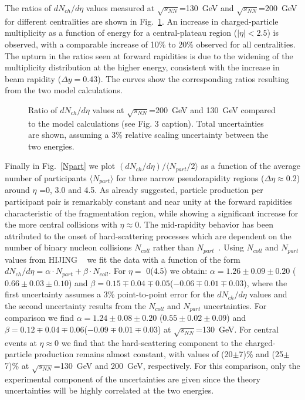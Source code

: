 \documentclass[preprint,showpacs,preprintnumbers,amsmath,amssymb]{revtex4}
\begin{document}
The ratios of  $dN_{ch}/d\eta$ 
values  measured at
$\sqrt{s_{NN}}$=130~GeV and $\sqrt{s_{NN}}$=200~GeV for different
centralities are shown in Fig.~\ref{dndeta_ratios}. An
increase in charged-particle multiplicity as a function of
energy for a central-plateau region ($|\eta| < 2.5$) is observed, 
with  a comparable increase  of 10\% to
20\% observed for all centralities. 
The upturn in the ratios seen at forward rapidities is due to the 
widening of the multiplicity distribution at the higher energy, 
consistent with the increase in beam rapidity ($\Delta y = 0.43$). 
The curves show the corresponding ratios resulting from the 
two model calculations.
\begin{figure}
  \caption{
    Ratio of $dN_{ch}/d\eta$ values 
    at $\sqrt{s_{NN}}$=200~GeV and 130~GeV
    compared to the model calculations (see Fig. 3 caption). 
    Total uncertainties are shown, assuming a 3\% relative scaling
    uncertainty between the two energies.}
  \label{dndeta_ratios}
\end{figure}

Finally in Fig.~\ref{Npart} we plot 
$(dN_{ch}/d\eta)/\langle N_{part}/2\rangle$
as a function of
the average number of participants $\langle N_{part}\rangle$ 
for three narrow pseudorapidity
regions ($\Delta \eta \approx 0.2$) around $\eta$ =0, 3.0 and
4.5. As already 
suggested, particle production per participant
pair is remarkably constant and near unity
at the  forward rapidities characteristic
of the fragmentation region, while showing a significant increase 
for the more central collisions with $\eta\approx 0$. 
The mid-rapidity behavior has been attributed to the
onset of hard-scattering processes which are dependent on the number of 
binary nucleon collisions
$N_{coll}$ rather than $N_{part}$~\cite{adcox01}. 
Using  $N_{coll}$ and $N_{part}$ values from HIJING
~\cite{wang91} we fit the data with a
function of the form 
$dN_{ch}/d\eta=\alpha\cdot N_{part}+\beta \cdot N_{coll}$. 
For $\eta=$ 0(4.5) we obtain: $\alpha=1.26 \pm 0.09 \pm 0.20$ 
($0.66 \pm 0.03 \pm 0.10$) 
and $\beta=0.15 \mp 0.04 \mp 0.05$($-0.06 \mp 0.01 \mp 0.03$), where the 
first uncertainty assumes a 3\%  point-to-point error
for the $dN_{ch}/d\eta$ values and
the second uncertainty results from the $N_{coll}$ 
and $N_{part}$
uncertainties.
For comparison we find $\alpha=1.24 \pm 0.08 \pm 0.20$
($0.55 \pm 0.02 \pm 0.09$) and 
$\beta=0.12 \mp 0.04 \mp 0.06$($-0.09 \mp 0.01 \mp 0.03$) at
$\sqrt{s_{NN}}$=130~GeV. For central events at $\eta\approx 0$ 
we find that the hard-scattering 
component to the charged-particle production remains
almost constant, with values of 
(20$\pm$7)\% and (25$\pm$7)\% at
$\sqrt{s_{NN}}$=130~GeV and 200~GeV, respectively. 
For this comparison, 
only the experimental component of the uncertainties 
are given since the
theory uncertainties will be highly correlated at the two
energies. 
\end{document}
